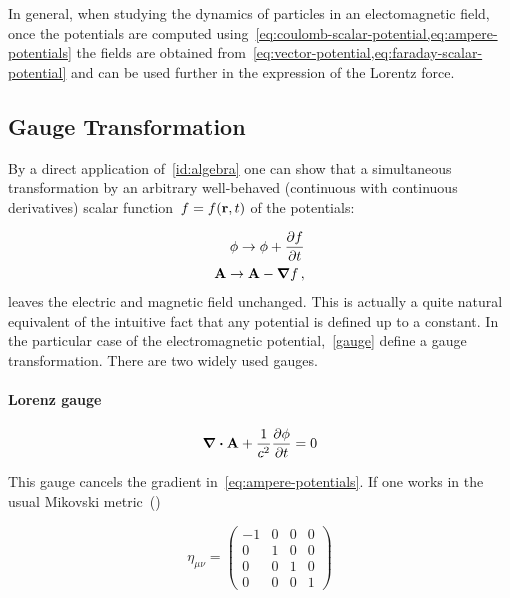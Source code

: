 \documentclass[12pt, class=report, crop=false]{standalone}
\begin{document}
In general, when studying the dynamics of particles in an electomagnetic field, once the potentials are computed using~\cref{eq:coulomb-scalar-potential,eq:ampere-potentials} the fields are obtained from~\cref{eq:vector-potential,eq:faraday-scalar-potential} and can be used further in the expression of the Lorentz force.

\subsection{Gauge Transformation}
\label{ch-ref-1}
By a direct application of~\cref{id:algebra} one can show that a simultaneous transformation by an arbitrary well-behaved (continuous with continuous derivatives) scalar function~\(f=f(\vb{r},t)\) of the potentials:

\begin{subequations}
  \label{gauge}
  \begin{align}
    \phi \rightarrow \phi + \pdv{f}{t} \\
    \vb{A} \rightarrow \vb{A} - \grad{f} \,,
  \end{align}
\end{subequations}
leaves the electric and magnetic field unchanged. This is actually a quite natural equivalent of the intuitive fact that any potential is defined up to a constant. In the particular case of the electromagnetic potential,~\cref{gauge} define a gauge transformation. There are two widely used gauges.

\paragraph{Lorenz gauge}

\begin{equation}
  \label{eq:lorenz-gauge}
  \div{\vb{A}} + \frac{1}{c^2} \pdv{\phi}{t}=0
\end{equation}

\par
This gauge cancels the gradient in~\cref{eq:ampere-potentials}. If one works in the usual Mikovski metric~(\cite{weinbergGravitationCosmologyPrinciples1972})

\begin{equation}
  \label{metric}
  \eta_{\mu \nu} =
    \begin{pmatrix}
      -1 & 0 & 0 & 0 \\
      0 & 1 & 0 & 0 \\
      0 & 0 & 1 & 0 \\
      0 & 0 & 0 & 1
    \end{pmatrix}
\end{equation}
\end{document}
